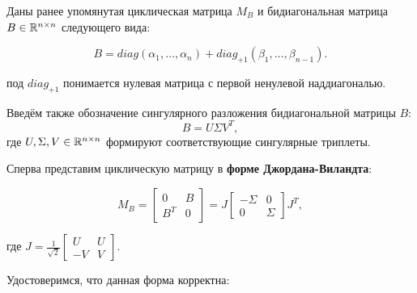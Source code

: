 
Даны ранее упомянутая циклическая матрица \(M_B\) и бидиагональная матрица \(B \in \mathbb{R}^{n \times n}\) следующего вида:

\begin{equation}
    B= diag(\alpha_1,\dots,\alpha_n)+diag_{+1}(\beta_1,\dots,\beta_{n-1}).
\end{equation}

\begin{note}
    под \(diag_{+1}\) понимается нулевая матрица с первой ненулевой наддиагональю.
\end{note}

\begin{note}
    Введём также обозначение сингулярного разложения бидиагональной матрицы \(B\):
    \[
    B=U\Sigma V^T,
    \]
    где \(U,\Sigma,V \in \mathbb{R}^{n \times n}\) формируют соответствующие сингулярные триплеты.
\end{note}
Сперва представим циклическую матрицу в \textbf{форме Джордана-Виландта}:

\begin{equation}
    M_B= \begin{bmatrix}
        0 & B \\
        B^T & 0
    \end{bmatrix} = J
    \begin{bmatrix}
        -\Sigma & 0 \\
        0 & \Sigma
    \end{bmatrix} J^T,
\end{equation}

где \(J= \frac{1}{\sqrt{2}}\begin{bmatrix}
    U & U \\
    -V & V
\end{bmatrix}\).

Удостоверимся, что данная форма корректна:

